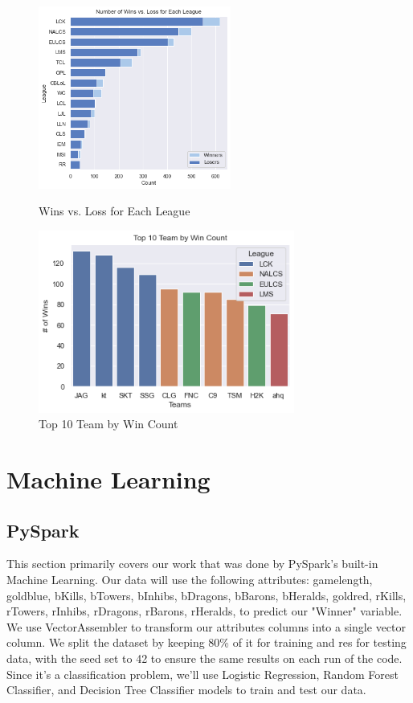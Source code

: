 \documentclass[conference]{IEEEtran}
\begin{document}
\begin{figure}[!ht]
  \begin{center}
 \includegraphics[height=6cm]{graphics/win_v_loss.png}
 \caption{Wins vs. Loss for Each League}
 \label{Wins vs. Loss for Each League}
 \end{center}
	
  \begin{center}
 \includegraphics[height=6cm]{graphics/teams_win.png}
 \caption{Top 10 Team by Win Count}
 \label{Top 10 Team by Win Count}
 \end{center}
\end{figure}

\section{Machine Learning}
\subsection{PySpark}
This section primarily covers our work that was done by PySpark's built-in Machine Learning. Our data will use the following attributes: gamelength, goldblue, bKills, bTowers, bInhibs, bDragons, bBarons, bHeralds, goldred, rKills, rTowers, rInhibs, rDragons, rBarons, rHeralds, to predict our "Winner" variable. We use VectorAssembler to transform our attributes columns into a single vector column. We split the dataset by keeping 80\% of it for training and res for testing data, with the seed set to 42 to ensure the same results on each run of the code. Since it's a classification problem, we'll use Logistic Regression, Random Forest Classifier,  and Decision Tree Classifier models to train and test our data.\\
\end{document}
